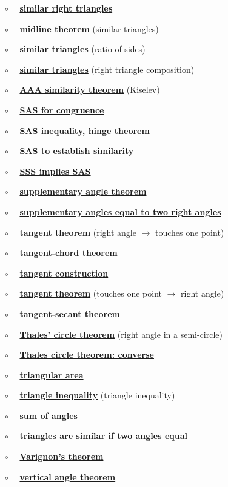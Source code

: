 \documentclass[11pt, oneside]{article}
\begin{document}
$\circ$ \ \ \hyperref[sec:similar_right_triangles]{\textbf{similar right triangles}}

$\circ$ \ \ \hyperref[sec:midline_theorem]{\textbf{midline theorem}} (similar triangles)

$\circ$ \ \  \hyperref[sec:similarity_equal_ratios]{\textbf{similar triangles}} (ratio of sides)

$\circ$ \ \  \hyperref[sec:similarity_right_to_all_triangles]{\textbf{similar triangles}} (right triangle composition)

$\circ$ \ \ \hyperref[sec:similarity_theorem]{\textbf{AAA similarity theorem}} (Kiselev)

$\circ$ \ \ \hyperref[sec:SAS]{\textbf{SAS for congruence}}

$\circ$ \ \ \hyperref[sec:hinge_theorem]{\textbf{SAS inequality, hinge theorem}}

$\circ$ \ \ \hyperref[sec:SAS_similar]{\textbf{SAS to establish similarity}}

$\circ$ \ \ \hyperref[sec:SSS_implies_SAS]{\textbf{SSS implies SAS}}

$\circ$ \ \ \hyperref[sec:supplementary_angle_theorem]{\textbf{supplementary angle theorem}}

$\circ$ \ \ \hyperref[sec:two_supplementary_equal_two_right]{\textbf{supplementary angles equal to two right angles}}

$\circ$ \ \ \hyperref[sec:tangent_one_point]{\textbf{tangent theorem}} (right angle $\rightarrow$ touches one point)

$\circ$ \ \ \hyperref[sec:tangent_chord_theorem]{\textbf{tangent-chord theorem}}

$\circ$ \ \ \hyperref[sec:tangent_construction]{\textbf{tangent construction}}

$\circ$ \ \ \hyperref[sec:tangent_perpendicular]{\textbf{tangent theorem}} (touches one point $\rightarrow$ right angle)

$\circ$ \ \ \hyperref[sec:tangent_secant_theorem]{\textbf{tangent-secant theorem}}

$\circ$ \ \ \hyperref[sec:Thales_theorem]{\textbf{Thales' circle theorem}} (right angle in a semi-circle)

$\circ$ \ \ \hyperref[sec:Thales_circle_theorem_converse]{\textbf{Thales circle theorem:  converse}}

$\circ$ \ \ \hyperref[sec:triangle_area]{\textbf{triangular area}}

$\circ$ \ \ \hyperref[sec:triangle_inequality]{\textbf{triangle inequality}} (triangle inequality)

$\circ$ \ \  \hyperref[sec:triangle_sum_theorem]{\textbf{sum of angles}}

$\circ$ \ \ \hyperref[sec:two_angles_similar]{\textbf{triangles are similar if two angles equal}}

$\circ$ \ \ \hyperref[sec:Varignon_theorem]{\textbf{Varignon's theorem}}

$\circ$ \ \ \hyperref[sec:vertical_angle_theorem]{\textbf{vertical angle theorem}}
\end{document}
